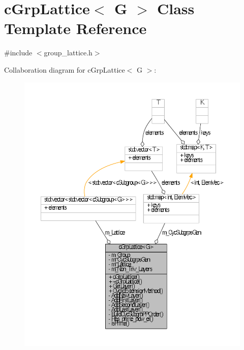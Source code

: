 \hypertarget{classcGrpLattice}{\section{c\-Grp\-Lattice$<$ \-G $>$ \-Class \-Template \-Reference}
\label{classcGrpLattice}
}


{\ttfamily \#include $<$group\-\_\-lattice.\-h$>$}



\-Collaboration diagram for c\-Grp\-Lattice$<$ \-G $>$\-:\nopagebreak
\begin{figure}[H]
\begin{center}
\leavevmode
\includegraphics[width=350pt]{classcGrpLattice__coll__graph}
\end{center}
\end{figure}
